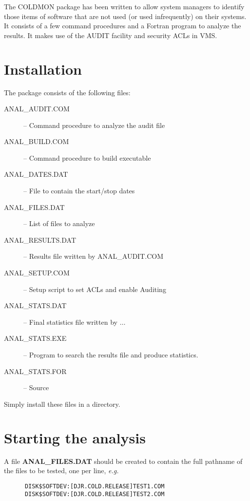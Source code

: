 The COLDMON package has been written to allow system managers to identify those
items of software that are not used (or used infrequently) on their systems. It
consists of a few command procedures and a Fortran program to analyze the
results. It makes use of the AUDIT facility and security ACLs in VMS.

\section{Installation}

The package consists of the following files:

\begin{description}
\begin{description}
\item [ANAL\_AUDIT.COM]  -- Command procedure to analyze the audit file
\item [ANAL\_BUILD.COM]  -- Command procedure to build executable
\item [ANAL\_DATES.DAT]  -- File to contain the start/stop dates
\item [ANAL\_FILES.DAT] -- List of files to analyze
\item [ANAL\_RESULTS.DAT]  -- Results file written by ANAL\_AUDIT.COM
\item [ANAL\_SETUP.COM]  -- Setup script to set ACLs and enable Auditing
\item [ANAL\_STATS.DAT]  -- Final statistics file written by $\ldots$
\item [ANAL\_STATS.EXE]  -- Program to search the results file and produce
statistics.
\item [ANAL\_STATS.FOR]  -- Source
\end{description}
\end{description}

Simply install these files in a directory.

\section{Starting the analysis}

A file {\bf ANAL\_FILES.DAT} should be created to contain the full pathname of
the files to be tested, one per line, {\em e.g.}

\begin{verbatim}
      DISK$SOFTDEV:[DJR.COLD.RELEASE]TEST1.COM
      DISK$SOFTDEV:[DJR.COLD.RELEASE]TEST2.COM
\end{verbatim}

